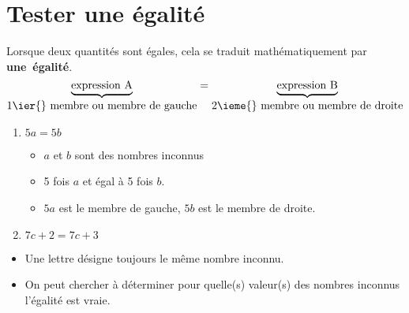 \section{Tester une égalité}
\vspace*{-5mm}
\begin{definition}
    Lorsque deux quantités sont égales, cela se traduit mathématiquement par \mbox{\textbf{une égalité}}.
    $$\underbrace{\mbox{expression A}}_{\mbox{1\ier{} membre ou membre de gauche}}=\underbrace{\mbox{expression B}}_{\mbox{2\ieme{} membre ou membre de droite}}$$
\end{definition}
\vspace*{-5mm}
\begin{exemple*1}
    \begin{enumerate}
        \item $5a=5b$ 
        \begin{itemize}
            \item $a$ et $b$ sont des nombres inconnus
            \item 5 fois $a$ et égal à 5 fois $b$.
            \item $5a$ est le membre de gauche, $5b$ est le membre de droite.
        \end{itemize}
        \item $7c+2=7c+3$
    \end{enumerate}
\end{exemple*1}
\vspace*{-5mm}
\begin{changemargin}{0mm}{-10mm}
\begin{remarque}
    \begin{itemize}
        \item Une lettre désigne toujours le même nombre inconnu.
        \item On peut chercher à déterminer pour quelle(s) valeur(s) des nombres inconnus l'égalité est vraie.
    \end{itemize}
\end{remarque}
\end{changemargin}
\vspace*{-5mm}
